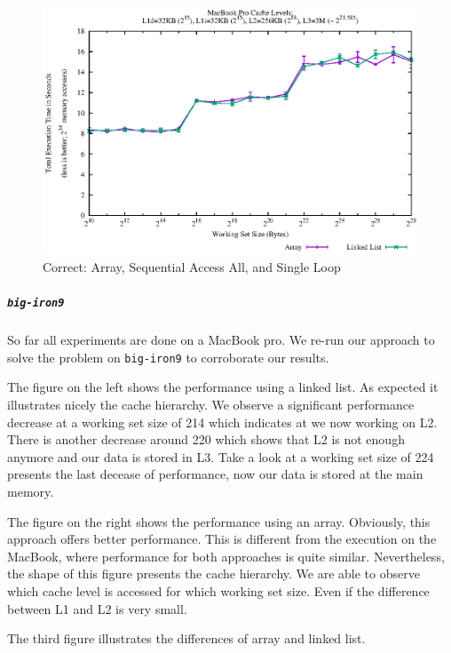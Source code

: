\begin{figure}[htbp]
\centering
\includegraphics{appendix/plots-cache-measurements/plot-correct-array-ll}
\caption{Correct: Array, Sequential Access All, and Single Loop}
\label{app:correct-arr-seqaccall-sl}
\end{figure}

\hypertarget{big-iron9}{\subparagraph{\texorpdfstring{\texttt{big-iron9}}{big-iron9}}\label{big-iron9}}

So far all experiments are done on a MacBook pro. We re-run our approach
to solve the problem on \texttt{big-iron9} to corroborate our results.

The figure on the left shows the performance using a linked list. As
expected it illustrates nicely the cache hierarchy. We observe a
significant performance decrease at a working set size of 214 which
indicates at we now working on L2. There is another decrease around 220
which shows that L2 is not enough anymore and our data is stored in L3.
Take a look at a working set size of 224 presents the last decease of
performance, now our data is stored at the main memory.

The figure on the right shows the performance using an array. Obviously,
this approach offers better performance. This is different from the
execution on the MacBook, where performance for both approaches is quite
similar. Nevertheless, the shape of this figure presents the cache
hierarchy. We are able to observe which cache level is accessed for
which working set size. Even if the difference between L1 and L2 is very
small.

The third figure illustrates the differences of array and linked list.

